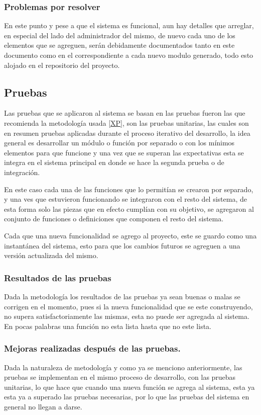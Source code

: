 \documentclass[12pt]{article} %
\begin{document}
	\subsubsection{Problemas por resolver}
		En este punto y pese a que el sistema es funcional, aun hay detalles que arreglar, en especial del lado del administrador del mismo, de nuevo cada uno de los elementos
		que se agreguen, serán debidamente documentados tanto en este documento como en el correspondiente a cada nuevo modulo generado, todo esto alojado en el repositorio 
		del proyecto.
	
  \subsection{Pruebas}
		Las pruebas que se aplicaron al sistema se basan en las pruebas fueron las que recomienda la metodología usada \ref{XP}, son las pruebas unitarias, las cuales son en
		resumen pruebas aplicadas durante el proceso iterativo del desarrollo, la idea general es desarrollar un módulo o función por separado o con los mínimos
		elementos para que funcione y una vez que se superan las expectativas esta se integra en el sistema principal en donde se hace la segunda prueba o de integración.

		En este caso cada una de las funciones que lo permitían se crearon por separado, y una ves que estuvieron funcionando se integraron con el resto del sistema, de esta
		forma solo las piezas que en efecto cumplían con su objetivo, se agregaron al conjunto de funciones o definiciones que componen el resto del sistema.
		
		Cada que una nueva funcionalidad se agrego al proyecto, este se guardo como una instantánea del sistema, esto para que los cambios futuros se agreguen a una versión 
		actualizada del mismo.
		\subsubsection{Resultados de las pruebas}
			Dada la metodología los resultados de las pruebas ya sean buenas o malas se corrigen en el momento, pues si la nueva funcionalidad que se este construyendo, no supera
			satisfactoriamente las mismas, esta no puede ser agregada al sistema.
			En pocas palabras una función no esta lista hasta que no este lista.
		
		\subsubsection{Mejoras realizadas después de las pruebas.}
			Dada la naturaleza de metodología y como ya se menciono anteriormente, las pruebas se implementan en el mismo proceso de desarrollo, con las pruebas unitarias, lo que
			hace que cuando una nueva función se agrega al sistema, esta ya esta ya a superado las pruebas necesarias, por lo que las pruebas del sistema en general no llegan a
			darse.
			
\end{document}
